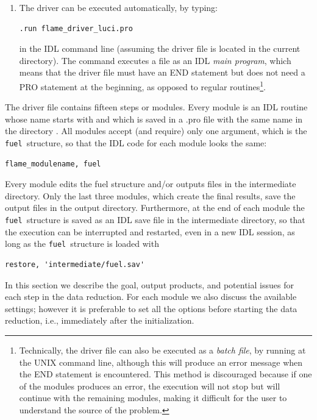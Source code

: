 \documentclass[a4paper]{article}
\newcommand{\fuel}{\texttt{fuel}}
\begin{document}
\begin{sloppypar}
\begin{enumerate}
\item The driver can be executed automatically, by typing:
\begin{lstlisting}
.run flame_driver_luci.pro
\end{lstlisting}
in the IDL command line (assuming the driver file is located in the current directory). The  command executes a file as an IDL \emph{main program}, which means that the driver file must have an END statement but does not need a PRO statement at the beginning, as opposed to regular routines\footnote{Technically, the driver file can also be executed as a \emph{batch file}, by running  at the UNIX command line, although this will produce an error message when the END statement is encountered. This method is discouraged because if one of the modules produces an error, the execution will not stop but will continue with the remaining modules, making it difficult for the user to understand the source of the problem.}.
\end{enumerate}

The driver file contains fifteen steps or modules. Every module is an IDL routine whose name starts with  and which is saved in a .pro file with the same name in the directory . All modules accept (and require) only one argument, which is the \fuel\ structure, so that the IDL code for each module looks the same:
\begin{lstlisting}
flame_modulename, fuel
\end{lstlisting}

Every module edits the fuel structure and/or outputs files in the intermediate directory. Only the last three modules, which create the final results, save the output files in the output directory. Furthermore, at the end of each module the \fuel\ structure is saved as an IDL save file in the intermediate directory, so that the execution can be interrupted and restarted, even in a new IDL session, as long as the \fuel\ structure is loaded with
\begin{lstlisting}
restore, 'intermediate/fuel.sav'
\end{lstlisting}

In this section we describe the goal, output products, and potential issues for each step in the data reduction. For each module we also discuss the available settings; however it is preferable to set all the options before starting the data reduction, i.e., immediately after the initialization.


\end{sloppypar}
\end{document}
